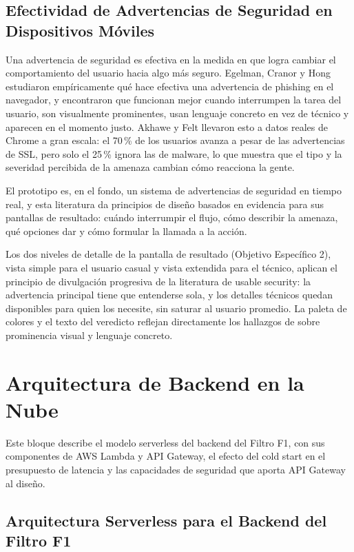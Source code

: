 \subsection{Efectividad de Advertencias de Seguridad en Dispositivos M\'oviles}

Una advertencia de seguridad es efectiva en la medida en que logra cambiar el comportamiento del usuario hacia algo m\'as seguro. Egelman, Cranor y Hong \cite{egelman2008warned} estudiaron emp\'iricamente qu\'e hace efectiva una advertencia de phishing en el navegador, y encontraron que funcionan mejor cuando interrumpen la tarea del usuario, son visualmente prominentes, usan lenguaje concreto en vez de t\'ecnico y aparecen en el momento justo. Akhawe y Felt \cite{akhawe2013alice} llevaron esto a datos reales de Chrome a gran escala: el 70\,\% de los usuarios avanza a pesar de las advertencias de SSL, pero solo el 25\,\% ignora las de malware, lo que muestra que el tipo y la severidad percibida de la amenaza cambian c\'omo reacciona la gente.

El prototipo es, en el fondo, un sistema de advertencias de seguridad en tiempo real, y esta literatura da principios de dise\~no basados en evidencia para sus pantallas de resultado: cu\'ando interrumpir el flujo, c\'omo describir la amenaza, qu\'e opciones dar y c\'omo formular la llamada a la acci\'on.

Los dos niveles de detalle de la pantalla de resultado (Objetivo Espec\'ifico 2), vista simple para el usuario casual y vista extendida para el t\'ecnico, aplican el principio de divulgaci\'on progresiva de la literatura de usable security: la advertencia principal tiene que entenderse sola, y los detalles t\'ecnicos quedan disponibles para quien los necesite, sin saturar al usuario promedio. La paleta de colores y el texto del veredicto reflejan directamente los hallazgos de \cite{egelman2008warned,akhawe2013alice} sobre prominencia visual y lenguaje concreto.

\section{Arquitectura de Backend en la Nube}

Este bloque describe el modelo serverless del backend del Filtro F1, con sus componentes de AWS Lambda y API Gateway, el efecto del cold start en el presupuesto de latencia y las capacidades de seguridad que aporta API Gateway al dise\~no.

\subsection{Arquitectura Serverless para el Backend del Filtro F1}

